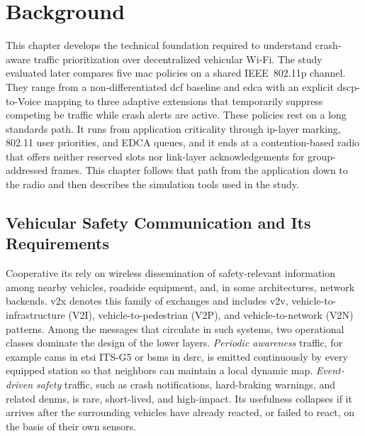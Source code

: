 \chapter{Background}
\label{chap:background}

This chapter develops the technical foundation required to understand crash-aware traffic prioritization over decentralized vehicular Wi-Fi.
The study evaluated later compares five \gls{mac} policies on a shared IEEE~802.11p channel.
They range from a non-differentiated \gls{dcf} baseline and \gls{edca} with an explicit \gls{dscp}-to-Voice mapping to three adaptive extensions that temporarily suppress competing \gls{be} traffic while crash alerts are active.
These policies rest on a long standards path.
It runs from application criticality through \gls{ip}-layer marking, 802.11 user priorities, and EDCA queues, and it ends at a contention-based radio that offers neither reserved slots nor link-layer acknowledgements for group-addressed frames.
This chapter follows that path from the application down to the radio and then describes the simulation tools used in the study.

\section{Vehicular Safety Communication and Its Requirements}
\label{sec:bg:v2x}

Cooperative \gls{its} rely on wireless dissemination of safety-relevant information among nearby vehicles, roadside equipment, and, in some architectures, network backends.
\gls{v2x} denotes this family of exchanges and includes \gls{v2v}, vehicle-to-infrastructure (V2I), vehicle-to-pedestrian (V2P), and vehicle-to-network (V2N) patterns.
Among the messages that circulate in such systems, two operational classes dominate the design of the lower layers.
\emph{Periodic awareness} traffic, for example \glspl{cam} in \gls{etsi} ITS-G5 or \glspl{bsm} in \gls{dsrc}, is emitted continuously by every equipped station so that neighbors can maintain a local dynamic map.
\emph{Event-driven safety} traffic, such as crash notifications, hard-braking warnings, and related \glspl{denm}, is rare, short-lived, and high-impact.
Its usefulness collapses if it arrives after the surrounding vehicles have already reacted, or failed to react, on the basis of their own sensors.

